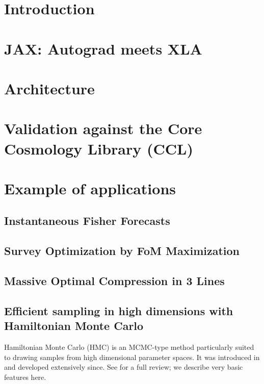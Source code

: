\documentclass[final,5p,times,twocolumn,authoryear]{elsarticle}
\begin{document}


\section{Introduction}



\section{JAX: Autograd meets XLA}


\section{Architecture}


\section{Validation against the Core Cosmology Library (CCL)} 

\section{Example of applications}

\subsection{Instantaneous Fisher Forecasts}


\subsection{Survey Optimization by FoM Maximization}


\subsection{Massive Optimal Compression in 3 Lines}

\subsection{Efficient sampling in high dimensions with Hamiltonian Monte Carlo}

Hamiltonian Monte Carlo (HMC) is an MCMC-type method particularly suited to drawing
samples from high dimensional parameter spaces.  It was introduced in \citet{duane}
and developed extensively since.  See \citep{betancourt} for a full review; we describe
very basic features here.
\end{document}
